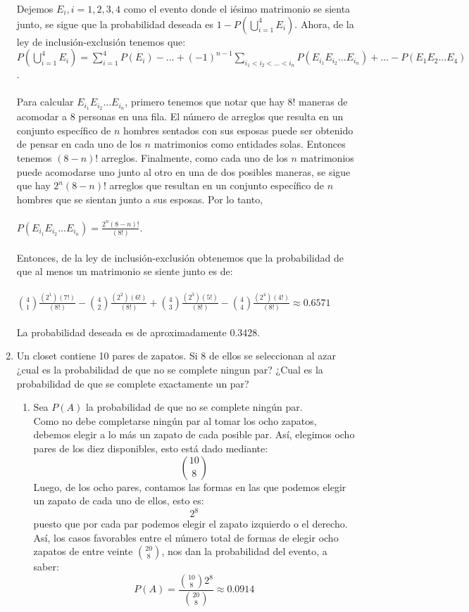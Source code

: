 \documentclass[12pt,a4paper]{report}
\begin{document}
\begin{enumerate}
{Dejemos $E_{i}, i= 1,2,3,4$ como el evento donde el iésimo matrimonio se sienta junto, se sigue que la probabilidad deseada es $1 - P(\bigcup\limits_{i=1}^{4}E_{i})$. Ahora, de la ley de inclusión-exclusión tenemos que:
\\$P(\bigcup\limits_{i=1}^{4}E_{i}) = \sum_{i=1}^{4} P(E_{i}) - ... + (-1)^{n-1}\sum_{i_{1} < i_{2} < ... < i_{n}}P(E_{i_{1}}E_{i_{2}}...E_{i_{n}}) + ... - P(E_{1}E_{2}...E_{4})$.\\
\\Para calcular $E_{i_{1}}E_{i_{2}}...E_{i_{n}}$, primero tenemos que notar que hay 8! maneras de acomodar a 8 personas en una fila. El número de arreglos que resulta en un conjunto específico de $n$ hombres sentados con sus esposas puede ser obtenido de pensar en cada uno de los $n$ matrimonios como entidades solas. Entonces tenemos $(8-n)!$ arreglos. Finalmente, como cada uno de los $n$ matrimonios puede acomodarse uno junto al otro en una de dos posibles maneras, se sigue que hay $2^n(8-n)!$ arreglos que resultan en un conjunto específico de $n$ hombres que se sientan junto a sus esposas. Por lo tanto,\\
\\$P(E_{i_{1}}E_{i_{2}}...E_{i_{n}}) = \frac{2^n(8-n)!}{(8!)}$.\\
\\Entonces, de la ley de inclusión-exclusión obtenemos que la probabilidad de que al menos un matrimonio se siente junto es de:\\
\\$ {4 \choose 1}\frac{(2^1)(7!)}{(8!)} - {4 \choose 2}\frac{(2^2)(6!)}{(8!)} + {4 \choose 3}\frac{(2^3)(5!)}{(8!)} - {4 \choose 4}\frac{(2^4)(4!)}{(8!)} \approx 0.6571$\\
\\La probabilidad deseada es de aproximadamente 0.3428.

  }

  \item{
	Un closet contiene 10 pares de zapatos. Si 8 de ellos se seleccionan al
	azar ¿cual es la probabilidad de que no se complete ningun par? ¿Cual es la
	probabilidad de que se complete exactamente un par?

	\begin{enumerate}
	\item{
	Sea $P(A)$ la probabilidad de que no se complete ningún par.\\
	Como no debe completarse ningún par al tomar los ocho zapatos, debemos
	elegir a lo más un zapato de cada posible par. Así, elegimos ocho pares de
	los diez disponibles, esto está dado mediante:
		$${10}\choose{8}$$
	Luego, de los ocho pares, contamos las formas en las que podemos elegir un
	zapato de cada uno de ellos, esto es:
		$$2^8$$
	puesto que por cada par podemos elegir el zapato izquierdo o el derecho.
	Así, los casos favorables entre el número total de formas de elegir
	ocho zapatos de entre veinte ${20}\choose{8}$, nos dan la probabilidad del
	evento, a saber:
		$$P(A) = \frac{ {10 \choose 8} 2^8 }{ {20 \choose 8} } \approx 0.0914 $$
	}


\end{enumerate}}
\end{enumerate}
\end{document}
